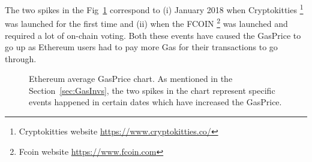 


The two spikes in the Fig~\ref{fig:Gas} correspond to (i) January 2018 when Cryptokitties \footnote{Cryptokitties website \url{https://www.cryptokitties.co/}} was launched for the first time and (ii) when the FCOIN \footnote{Fcoin website \url{https://www.fcoin.com}} was launched and required a lot of on-chain voting. Both these events have caused the GasPrice to go up as Ethereum users had to pay more Gas for their transactions to go through.



\begin{figure}[!htb]

	\centering
	\hfill
	\caption {Ethereum average GasPrice chart. As mentioned in the Section~\ref{sec:GasInvs}, the two spikes in the chart represent specific events happened in certain dates which have increased the GasPrice.}
	\label{fig:Gas}

\end{figure}


